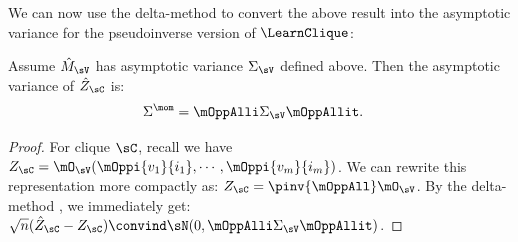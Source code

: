 
We can now use the delta-method to convert the above result into 
the asymptotic variance for the pseudoinverse version of $\LearnClique$:
\begin{lemma}
  \label{lem:mom-variance}  
  Assume $\hat M_{\sV}$ has asymptotic variance $\Sigma_\sV$ defined above.
  Then the asymptotic variance of $\hat Z_\sC$ is:
  \begin{align*}
    \Sigma^{\mom} &= \mOppAlli \Sigma_\sV \mOppAllit.
  \end{align*}
\end{lemma}
\begin{proof}
For clique $\sC$, recall we have
  $Z_{\sC} = \mO_\sV(\mOppi{v_1}{i_1},\cdots,\mOppi{v_m}{i_m})$.
We can rewrite this representation more compactly as: $Z_{\sC} = \pinv{\mOppAll} \mO_\sV$.
By the delta-method \cite{vaart98asymptotic},
we immediately get:
$\sqrt{n}(\hat Z_\sC - Z_\sC) \convind \sN(0, \mOppAlli \Sigma_\sV \mOppAllit)$.
\end{proof}

